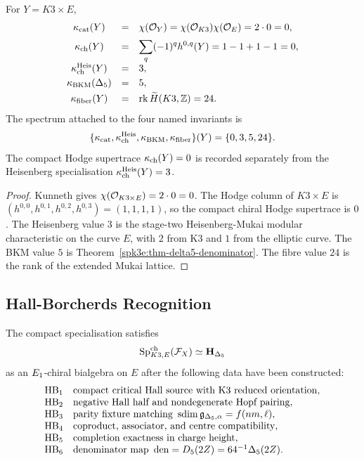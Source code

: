 \begin{proposition}
\label{spk3e:prop-four-invariants}
For \(Y=K3\times E\),
\[
\begin{array}{ccl}
 \kappa_{\mathrm{cat}}(Y) &=& \chi(\mathcal{O}_Y)=\chi(\mathcal{O}_{K3})\chi(\mathcal{O}_E)=2\cdot0=0,\\[2mm]
 \kappa_{\mathrm{ch}}(Y) &=& \displaystyle\sum_q(-1)^qh^{0,q}(Y)=1-1+1-1=0,\\[2mm]
 \kappa_{\mathrm{ch}}^{\mathrm{Heis}}(Y) &=& 3,\\[1mm]
 \kappa_{\mathrm{BKM}}(\Delta_5) &=& 5,\\[1mm]
 \kappa_{\mathrm{fiber}}(Y) &=& \operatorname{rk}\widetilde H(K3,\mathbb{Z})=24.
\end{array}
\]
The spectrum attached to the four named invariants is
\[
 \{\kappa_{\mathrm{cat}},\kappa_{\mathrm{ch}}^{\mathrm{Heis}},\kappa_{\mathrm{BKM}},\kappa_{\mathrm{fiber}}\}(Y)=\{0,3,5,24\}.
\]
The compact Hodge supertrace \(\kappa_{\mathrm{ch}}(Y)=0\) is recorded separately from
the Heisenberg specialisation \(\kappa_{\mathrm{ch}}^{\mathrm{Heis}}(Y)=3\).
\end{proposition}

\begin{proof}
Kunneth gives \(\chi(\mathcal{O}_{K3\times E})=2\cdot0=0\). The Hodge column of
\(K3\times E\) is \((h^{0,0},h^{0,1},h^{0,2},h^{0,3})=(1,1,1,1)\),
so the compact chiral Hodge supertrace is \(0\). The Heisenberg value
\(3\) is the stage-two Heisenberg-Mukai modular characteristic on the
curve \(E\), with \(2\) from K3 and \(1\) from the elliptic curve. The
BKM value \(5\) is Theorem~\ref{spk3e:thm-delta5-denominator}. The fibre
value \(24\) is the rank of the extended Mukai lattice.
\end{proof}

\subsection{Hall-Borcherds Recognition}
\label{spk3e:hall-borcherds-recognition}

\begin{conjecture}
\label{spk3e:conj-recognition}
The compact specialisation satisfies
\[
 \mathrm{Sp}^{\mathrm{ch}}_{K3,E}(\mathcal{F}_X)
 \simeq
 \mathbf H_{\Delta_5}
\]
as an \(E_1\)-chiral bialgebra on \(E\) after the following data have
been constructed:
\[
\begin{array}{ll}
 \mathrm{HB}_1 & \text{compact critical Hall source with K3 reduced orientation},\\
 \mathrm{HB}_2 & \text{negative Hall half and nondegenerate Hopf pairing},\\
 \mathrm{HB}_3 & \text{parity fixture matching }\operatorname{sdim}\mathfrak{g}_{\Delta_5,\alpha}=f(nm,\ell),\\
 \mathrm{HB}_4 & \text{coproduct, associator, and centre compatibility},\\
 \mathrm{HB}_5 & \text{completion exactness in charge height},\\
 \mathrm{HB}_6 & \text{denominator map } \operatorname{den}=D_5(2Z)=64^{-1}\Delta_5(2Z).
\end{array}
\]
\end{conjecture}


